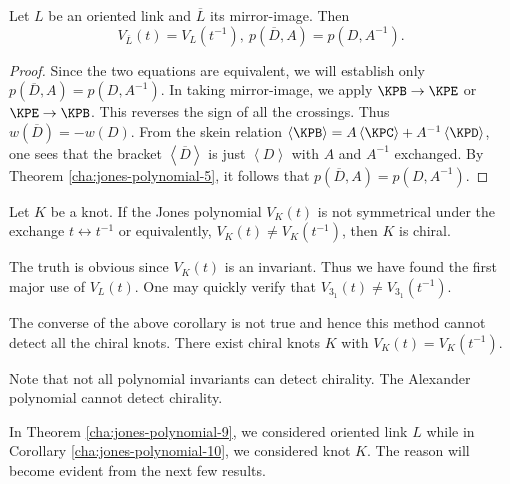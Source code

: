 \begin{theorem}
\label{cha:jones-polynomial-9}
  Let $L$ be an oriented link and $\overline{L}$ its mirror-image. Then 
\begin{equation}
\label{eq:2}
V_{\overline{L}}(t) = V_L(t^{-1}), \ p(\overline{D}, A) = p(D, A^{-1}).
\end{equation}
\end{theorem}

\begin{proof}
  Since the two equations are equivalent, we will establish only $p(\overline{D}, A) = p(D, A^{-1})$. In taking mirror-image, we apply $\KPB \to \KPE$ or $\KPE \to \KPB$. This reverses the sign of all the crossings. Thus $w(\overline{D}) = -w(D)$. From the skein relation $\left< \KPB \right> = A\left< \KPC \right> + A^{-1}\left< \KPD \right>$, one sees that the bracket $\left< \overline{D} \right>$ is just $\left< D \right>$ with $A$ and $A^{-1}$ exchanged. By Theorem \ref{cha:jones-polynomial-5}, it follows that $p(\overline{D}, A) = p(D, A^{-1})$.
\end{proof}

\begin{corollary}
\label{cha:jones-polynomial-10}
  Let $K$ be a knot. If the Jones polynomial $V_K(t)$ is not symmetrical under the exchange $t \leftrightarrow t^{-1}$ or equivalently, $V_K(t) \ne V_K(t^{-1})$, then $K$ is chiral.
\end{corollary}

The truth is obvious since $V_K(t)$ is an invariant. Thus we have found the first major use of $V_L(t)$. One may quickly verify that $V_{3_1}(t) \ne V_{3_1}(t^{-1})$.

\begin{remark}
\label{cha:jones-polynomial-11}
The converse of the above corollary is not true and hence this method cannot detect all the chiral knots. There exist chiral knots $K$ with $V_K(t) = V_K(t^{-1})$.
\end{remark}

Note that not all polynomial invariants can detect chirality. The Alexander polynomial cannot detect chirality.

\begin{remark}
\label{cha:jones-polynomial-12}
In Theorem \ref{cha:jones-polynomial-9}, we considered oriented link $L$ while in Corollary \ref{cha:jones-polynomial-10}, we considered knot $K$. The reason will become evident from the next few results. 
\end{remark}


